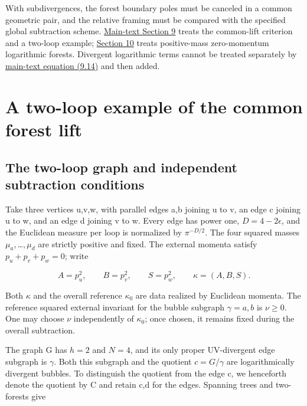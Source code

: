 \documentclass[11pt,a4paper,oneside]{article}
\theoremstyle{plain}
\theoremstyle{definition}
\theoremstyle{remark}
\numberwithin{equation}{section}
\newcommand{\otherref}[2]{\href{#1.pdf}{#2}}
\begin{document}
With subdivergences, the forest boundary poles must be canceled in a common geometric pair, and the relative framing must be compared with the specified global subtraction scheme. \otherref{feynman_periods_long_paper_en}{Main-text Section 9} treats the common-lift criterion and a two-loop example; \otherref{feynman_periods_long_paper_en}{Section 10} treats positive-mass zero-momentum logarithmic forests. Divergent logarithmic terms cannot be treated separately by \otherref{feynman_periods_long_paper_en}{main-text equation (9.14)} and then added.
\endgroup


\section{A two-loop example of the common forest lift}\label{supp:forest}

\begingroup

\subsection{The two-loop graph and independent subtraction conditions}\label{sec:forest:2}

Take three vertices u,v,w, with parallel edges a,b joining u to v, an edge c joining u to w, and an edge d joining v to w. Every edge has power one, \(D=4- 2\epsilon \), and the Euclidean measure per loop is normalized by \(\pi ^{- D/2}\). The four squared masses \(\mu _a,\)\ldots{}\(,\mu _d\) are strictly positive and fixed. The external momenta satisfy \(p_u+p_v+p_w=0\); write

\begin{equation}
A=p_u^2,\qquad B=p_v^2,\qquad S=p_w^2,
 \qquad \kappa=(A,B,S).
\end{equation}

Both \(\kappa \) and the overall reference \(\kappa _0\) are data realized by Euclidean momenta. The reference squared external invariant for the bubble subgraph \(\gamma ={a,b}\) is \(\nu \ge 0\). One may choose \(\nu \) independently of \(\kappa _0\); once chosen, it remains fixed during the overall subtraction.

The graph G has \(h=2\) and \(N=4\), and its only proper UV-divergent edge subgraph is \(\gamma \). Both this subgraph and the quotient \(c=G/\gamma \) are logarithmically divergent bubbles. To distinguish the quotient from the edge c, we henceforth denote the quotient by C and retain c,d for the edges. Spanning trees and two-forests give
\end{document}
